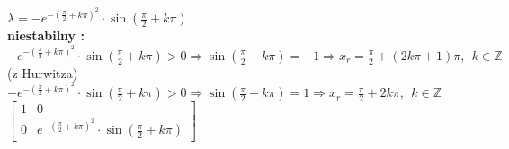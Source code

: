 $\lambda = -e^{-(\frac{\pi}{2}+k\pi)^2}\cdot \sin(\frac{\pi}{2}+k\pi)$\\
\textbf{niestabilny :}\\
$ -e^{-(\frac{\pi}{2}+k\pi)^2}\cdot \sin(\frac{\pi}{2}+k\pi)>0 \Rightarrow \sin(\frac{\pi}{2}+k\pi)=-1 \Rightarrow x_r=\frac{\pi}{2}+(2k\pi+1)\pi,\ \  k \in \mathbb{Z}$\\
(z Hurwitza)\\
$-e^{-(\frac{\pi}{2}+k\pi)^2}\cdot \sin(\frac{\pi}{2}+k\pi)>0 \Rightarrow \sin(\frac{\pi}{2}+k\pi)= 1 \Rightarrow x_r=\frac{\pi}{2}+2k\pi,\ \  k \in \mathbb{Z}$\\
$ \left[ \begin{array}{cc}    1&0 \\0&   e^{-(\frac{\pi}{2}+k\pi)^2}\cdot \sin(\frac{\pi}{2}+k\pi) \end{array}\right]$

\pagebreak
